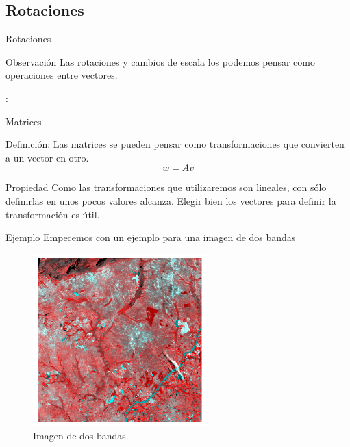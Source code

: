 \documentclass[]{beamer}
\begin{document}
\subsection{Rotaciones}
\begin{frame}{Rotaciones}
  \begin{block}{Observación}
    Las rotaciones y cambios de escala los podemos pensar como operaciones entre vectores.
  \end{block}:
\end{frame}

\begin{frame}{Matrices}
  \begin{block}{Definición:}
    Las matrices se pueden pensar como transformaciones que convierten a un vector en otro. \pause
    \begin{equation}
      w = Av
    \end{equation}
  \end{block}\pause
  \begin{alertblock}{Propiedad}
    Como las transformaciones que utilizaremos son lineales, con sólo definirlas en unos pocos valores alcanza. \pause Elegir bien los vectores para definir la transformación es útil.
  \end{alertblock}
\end{frame}

\begin{frame}{Ejemplo}
  Empecemos con un ejemplo para una imagen de dos bandas
  \begin{figure}
  \centering
  \includegraphics[width=0.6\textwidth]{imagenes/nir-red.png}
  \caption{Imagen de dos bandas.}
  \end{figure}
\end{frame}
\end{document}
